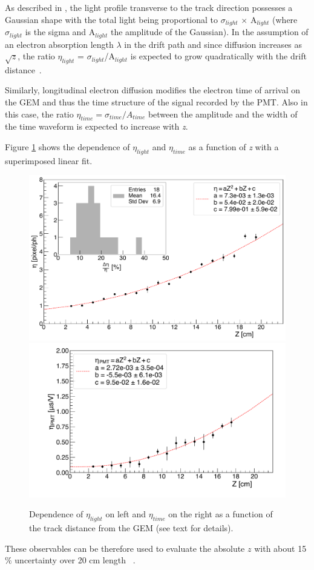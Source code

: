 \documentclass[physics,article,submit,moreauthors,pdftex]{Definitions/mdpi}
\begin{document}
As described in \cite{bib:Antochi_2021}, the light profile transverse to the track direction possesses a Gaussian shape with the total light being proportional to $\sigma_{light}$ $\times$ A$_{light}$ (where $\sigma_{light}$ is the sigma and A$_{light}$ the amplitude of the Gaussian). In the assumption of an electron absorption length $\lambda$ in the drift path and since diffusion increases as $\sqrt{z}$, the ratio $\eta_{light}$ = $\sigma_{light}$/A$_{light}$ is expected to grow quadratically with the drift distance~\cite{bib:lemon_btf}.

Similarly, longitudinal electron diffusion modifies the electron time of arrival on the GEM and thus the time structure of the signal recorded by the PMT. Also in this case, the ratio $\eta_{time} = \sigma_{time}/A_{time}$ between the amplitude and the width of the time waveform is expected to increase with {\it z}.


Figure \ref{fig:eta} shows the dependence of $\eta_{light}$ and $\eta_{time}$ as a function of {\it z} with a superimposed linear fit. 

\begin{figure}
\centering
\includegraphics[width=.31\textwidth]{Fig9-eta-CMOS-Z.pdf}
\includegraphics[width=.34\textwidth]{Fig10-eta-PMT-Z.pdf}
\caption{Dependence of $\eta_{light}$ on left and $\eta_{time}$ on the right as a function of the track distance from the GEM (see text for details).}
\label{fig:eta}
\end{figure}

These observables can be therefore used to evaluate the absolute $z$ with about 15$\%$ uncertainty over 20 cm length ~\cite{bib:lemon_btf}.

\end{document}
